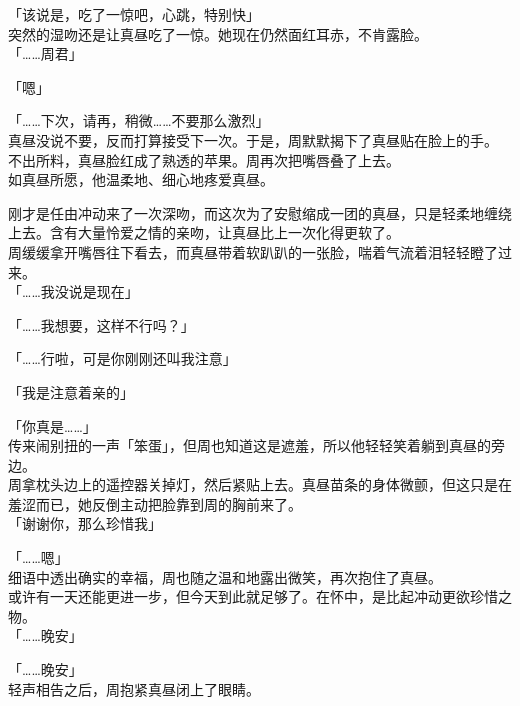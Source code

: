 「该说是，吃了一惊吧，心跳，特别快」\\

突然的湿吻还是让真昼吃了一惊。她现在仍然面红耳赤，不肯露脸。\\

「……周君」

「嗯」

「……下次，请再，稍微……不要那么激烈」\\

真昼没说不要，反而打算接受下一次。于是，周默默揭下了真昼贴在脸上的手。\\

不出所料，真昼脸红成了熟透的苹果。周再次把嘴唇叠了上去。\\

如真昼所愿，他温柔地、细心地疼爱真昼。

刚才是任由冲动来了一次深吻，而这次为了安慰缩成一团的真昼，只是轻柔地缠绕上去。含有大量怜爱之情的亲吻，让真昼比上一次化得更软了。\\

周缓缓拿开嘴唇往下看去，而真昼带着软趴趴的一张脸，喘着气流着泪轻轻瞪了过来。\\

「……我没说是现在」

「……我想要，这样不行吗？」

「……行啦，可是你刚刚还叫我注意」

「我是注意着亲的」

「你真是……」\\

传来闹别扭的一声「笨蛋」，但周也知道这是遮羞，所以他轻轻笑着躺到真昼的旁边。\\

周拿枕头边上的遥控器关掉灯，然后紧贴上去。真昼苗条的身体微颤，但这只是在羞涩而已，她反倒主动把脸靠到周的胸前来了。\\

「谢谢你，那么珍惜我」

「……嗯」\\

细语中透出确实的幸福，周也随之温和地露出微笑，再次抱住了真昼。\\

或许有一天还能更进一步，但今天到此就足够了。在怀中，是比起冲动更欲珍惜之物。\\

「……晚安」

「……晚安」\\

轻声相告之后，周抱紧真昼闭上了眼睛。
